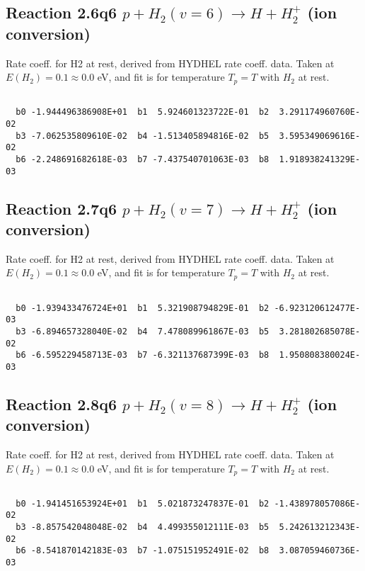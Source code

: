 \newpage
\subsection{
Reaction 2.6q6
$ p + H_2(v=6) \rightarrow H + H_2^+$ (ion conversion)
}
Rate coeff. for H2 at rest, derived from HYDHEL rate coeff. data.
Taken at $E(H_2) = 0.1 \approx 0.0$ eV,  and fit is for temperature $T_p=T$ with $H_2$ at rest.

\begin{small}\begin{verbatim}

  b0 -1.944496386908E+01  b1  5.924601323722E-01  b2  3.291174960760E-02
  b3 -7.062535809610E-02  b4 -1.513405894816E-02  b5  3.595349069616E-02
  b6 -2.248691682618E-03  b7 -7.437540701063E-03  b8  1.918938241329E-03

\end{verbatim}\end{small}

\newpage
\subsection{
Reaction 2.7q6
$ p + H_2(v=7) \rightarrow H + H_2^+$ (ion conversion)
}
Rate coeff. for H2 at rest, derived from HYDHEL rate coeff. data.
Taken at $E(H_2) = 0.1 \approx 0.0$ eV,  and fit is for temperature $T_p=T$ with $H_2$ at rest.

\begin{small}\begin{verbatim}

  b0 -1.939433476724E+01  b1  5.321908794829E-01  b2 -6.923120612477E-03
  b3 -6.894657328040E-02  b4  7.478089961867E-03  b5  3.281802685078E-02
  b6 -6.595229458713E-03  b7 -6.321137687399E-03  b8  1.950808380024E-03

\end{verbatim}\end{small}

\newpage
\subsection{
Reaction 2.8q6
$ p + H_2(v=8) \rightarrow H + H_2^+$ (ion conversion)
}
Rate coeff. for H2 at rest, derived from HYDHEL rate coeff. data.
Taken at $E(H_2) = 0.1 \approx 0.0$ eV,  and fit is for temperature $T_p=T$ with $H_2$ at rest.

\begin{small}\begin{verbatim}

  b0 -1.941451653924E+01  b1  5.021873247837E-01  b2 -1.438978057086E-02
  b3 -8.857542048048E-02  b4  4.499355012111E-03  b5  5.242613212343E-02
  b6 -8.541870142183E-03  b7 -1.075151952491E-02  b8  3.087059460736E-03

\end{verbatim}\end{small}

